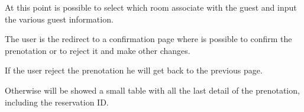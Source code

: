 At this point is possible to select which room associate with the guest and input the various guest information.


The user is the redirect to a confirmation page where is possible to confirm the prenotation or to reject it and make other changes.


If the user reject the prenotation he will get back to the previous page.

Otherwise will be showed a small table with all the last detail of the prenotation, including the reservation ID.


